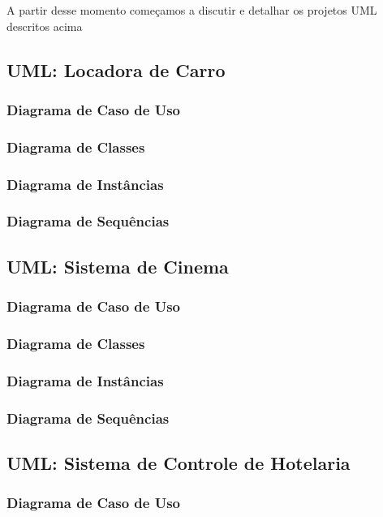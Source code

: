\documentclass[a4paper,10pt]{article}
\begin{document}
A partir desse momento começamos a discutir e detalhar os projetos UML descritos acima

\subsection{UML: Locadora de Carro}

\subsubsection{Diagrama de Caso de Uso}
\subsubsection{Diagrama de Classes}
\subsubsection{Diagrama de Instâncias}
\subsubsection{Diagrama de Sequências}

\subsection{UML: Sistema de Cinema}

\subsubsection{Diagrama de Caso de Uso}
\subsubsection{Diagrama de Classes}
\subsubsection{Diagrama de Instâncias}
\subsubsection{Diagrama de Sequências}

\subsection{UML: Sistema de Controle de Hotelaria} 

\subsubsection{Diagrama de Caso de Uso}
\end{document}
